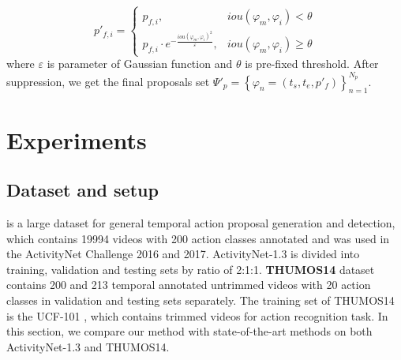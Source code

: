 \documentclass[runningheads]{llncs}
\begin{document}
\vspace{-0.05cm}
\begin{equation}
p'_{f,i}=\left\{\begin{matrix}
p_{f,i}, & iou(\varphi_m,\varphi_i)<\theta\\
p_{f,i}\cdot e^{-\frac{iou(\varphi_m,\varphi_i)^2}{\varepsilon }}, & iou(\varphi_m,\varphi_i)\geq \theta
\end{matrix}\right.
\end{equation}
where $\varepsilon $ is parameter of Gaussian function and $\theta$ is pre-fixed threshold.
After suppression, we get the final proposals set $\Psi'_p  = \left \{ \varphi  _n=(t_s,t_e,p'_f  ) \right \}_{n=1}^{N_p}$.
%



\section{Experiments}

\subsection{Dataset and setup}
 \cite{caba2015activitynet} is a large dataset for general temporal action proposal generation and detection, which contains 19994 videos   with 200 action classes annotated and was used in the ActivityNet Challenge 2016 and 2017. ActivityNet-1.3 is divided into training, validation and testing sets by ratio of 2:1:1.
{\bf THUMOS14} \cite{jiang2014thumos} dataset contains 200 and 213 temporal annotated untrimmed videos with 20 action classes in validation and testing sets separately. The training set of THUMOS14 is the UCF-101 \cite{soomro2012ucf101}, which contains trimmed videos for action recognition task.
In this section, we compare our method with state-of-the-art methods on both ActivityNet-1.3 and THUMOS14.%
\end{document}
